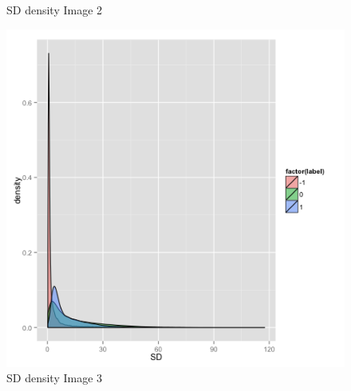 \documentclass{article}\usepackage[]{graphicx}\usepackage[]{color}
\begin{document}
\begin{figure}[h]
  \caption{SD density Image 2}\label{}
\endminipage\hfill
{}%
  \includegraphics[width=\linewidth]{SD3.png}
  \caption{SD density Image 3}\label{}
\endminipage
\end{figure}
\end{document}
